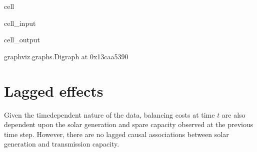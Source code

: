 \documentclass[letterpaper,10pt,english]{jupyterBook}
\begin{document}
\begin{sphinxuseclass}{cell}\begin{sphinxVerbatimInput}

\begin{sphinxuseclass}{cell_input}
\begin{sphinxVerbatim}[commandchars=\\\{\}]
  \PYG{p}{[}  \PYG{p}{]}
 
\end{sphinxVerbatim}

\end{sphinxuseclass}\end{sphinxVerbatimInput}
\begin{sphinxVerbatimOutput}

\begin{sphinxuseclass}{cell_output}
\begin{sphinxVerbatim}[commandchars=\\\{\}]
\PYGZlt{}graphviz.graphs.Digraph at 0x13caa5390\PYGZgt{}
\end{sphinxVerbatim}

\end{sphinxuseclass}\end{sphinxVerbatimOutput}

\end{sphinxuseclass}

\section{Lagged effects}
\label{\detokenize{notebooks/semiparametric_varlingam:lagged-effects}}
\sphinxAtStartPar
Given the time\sphinxhyphen{}dependent nature of the data, balancing costs at time \(t\) are also dependent upon the solar generation and spare capacity observed at the previous time step. However, there are no lagged causal associations between solar generation and transmission capacity.
\end{document}
